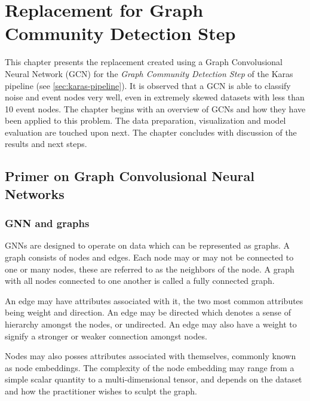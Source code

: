 
\chapter{Replacement for Graph Community Detection Step} %
\label{cha:gcn}
% 

This chapter presents the replacement created using a Graph
Convolusional Neural Network (GCN) for the \emph{Graph Community Detection
Step} of the Karas pipeline (see \ref{sec:karas-pipeline}). It is
observed that a GCN is able to classify noise and event nodes very
well, even in extremely skewed datasets with less than 10 event nodes.
The chapter begins with an overview of GCNs and how they have been
applied to this problem. The data preparation, visualization and model
evaluation are touched upon next. The chapter concludes with
discussion of the results and next steps.

\section{Primer on Graph Convolusional Neural Networks}
\label{sec:gcn-primer}

\subsection{GNN and graphs}

GNNs are designed to operate on data which can be represented as
graphs. A graph consists of nodes and edges. Each node may or may not
be connected to one or many nodes, these are referred to as the
neighbors of the node. A graph with all nodes connected to one another
is called a fully connected graph.

An edge may have attributes associated with it, the two most common
attributes being weight and direction. An edge may be directed which
denotes a sense of hierarchy amongst the nodes, or undirected. An edge
may also have a weight to signify a stronger or weaker connection
amongst nodes.

Nodes may also posses attributes associated with themselves, commonly
known as node embeddings. The complexity of the node embedding may
range from a simple scalar quantity to a multi-dimensional tensor,
and depends on the dataset and how the practitioner wishes to sculpt
the graph.

